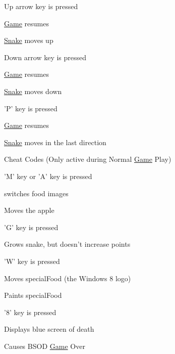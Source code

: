 \begin{DoxyItemize}
\begin{DoxyItemize}
\item \-Up arrow key is pressed
\begin{DoxyItemize}
\item \hyperlink{classGame}{\-Game} resumes
\item \hyperlink{classSnake}{\-Snake} moves up
\end{DoxyItemize}
\item \-Down arrow key is pressed
\begin{DoxyItemize}
\item \hyperlink{classGame}{\-Game} resumes
\item \hyperlink{classSnake}{\-Snake} moves down
\end{DoxyItemize}
\item '\-P' key is pressed
\begin{DoxyItemize}
\item \hyperlink{classGame}{\-Game} resumes
\item \hyperlink{classSnake}{\-Snake} moves in the last direction
\end{DoxyItemize}
\end{DoxyItemize}
\item \-Cheat \-Codes (\-Only active during \-Normal \hyperlink{classGame}{\-Game} \-Play)
\begin{DoxyItemize}
\item '\-M' key or '\-A' key is pressed
\begin{DoxyItemize}
\item switches food images
\item \-Moves the apple
\end{DoxyItemize}
\item '\-G' key is pressed
\begin{DoxyItemize}
\item \-Grows snake, but doesn't increase points
\end{DoxyItemize}
\item '\-W' key is pressed
\begin{DoxyItemize}
\item \-Moves special\-Food (the \-Windows 8 logo)
\item \-Paints special\-Food
\end{DoxyItemize}
\item '8' key is pressed
\begin{DoxyItemize}
\item \-Displays blue screen of death
\item \-Causes \-B\-S\-O\-D \hyperlink{classGame}{\-Game} \-Over

\end{DoxyItemize}
\end{DoxyItemize}
\end{DoxyItemize}
